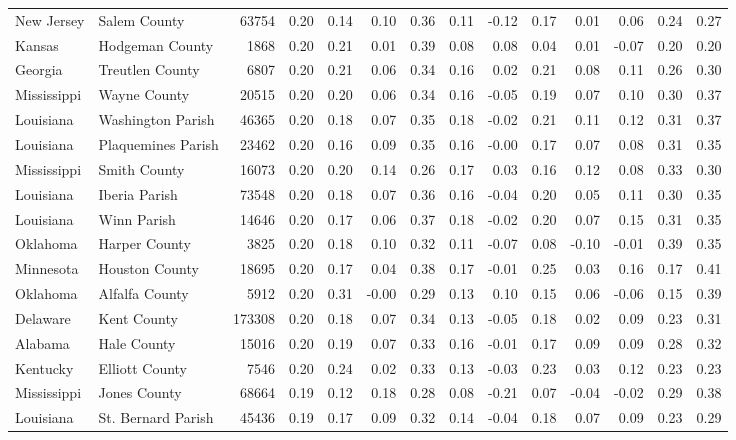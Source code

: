 \documentclass[10pt, letterpaper]{article}
\begin{document}
\begin{spacing}{1.4}
\begin{table}
{\begin{tabular}{llrrrrrrrrrrrr}
New Jersey & Salem County & 63754 & 0.20 & 0.14 & 0.10 & 0.36 & 0.11 & -0.12 & 0.17 & 0.01 & 0.06 & 0.24 & 0.27 \\
Kansas & Hodgeman County & 1868 & 0.20 & 0.21 & 0.01 & 0.39 & 0.08 & 0.08 & 0.04 & 0.01 & -0.07 & 0.20 & 0.20 \\
Georgia & Treutlen County & 6807 & 0.20 & 0.21 & 0.06 & 0.34 & 0.16 & 0.02 & 0.21 & 0.08 & 0.11 & 0.26 & 0.30 \\
Mississippi & Wayne County & 20515 & 0.20 & 0.20 & 0.06 & 0.34 & 0.16 & -0.05 & 0.19 & 0.07 & 0.10 & 0.30 & 0.37 \\
Louisiana & Washington Parish & 46365 & 0.20 & 0.18 & 0.07 & 0.35 & 0.18 & -0.02 & 0.21 & 0.11 & 0.12 & 0.31 & 0.37 \\
Louisiana & Plaquemines Parish & 23462 & 0.20 & 0.16 & 0.09 & 0.35 & 0.16 & -0.00 & 0.17 & 0.07 & 0.08 & 0.31 & 0.35 \\
Mississippi & Smith County & 16073 & 0.20 & 0.20 & 0.14 & 0.26 & 0.17 & 0.03 & 0.16 & 0.12 & 0.08 & 0.33 & 0.30 \\
Louisiana & Iberia Parish & 73548 & 0.20 & 0.18 & 0.07 & 0.36 & 0.16 & -0.04 & 0.20 & 0.05 & 0.11 & 0.30 & 0.35 \\
Louisiana & Winn Parish & 14646 & 0.20 & 0.17 & 0.06 & 0.37 & 0.18 & -0.02 & 0.20 & 0.07 & 0.15 & 0.31 & 0.35 \\
Oklahoma & Harper County & 3825 & 0.20 & 0.18 & 0.10 & 0.32 & 0.11 & -0.07 & 0.08 & -0.10 & -0.01 & 0.39 & 0.35 \\
Minnesota & Houston County & 18695 & 0.20 & 0.17 & 0.04 & 0.38 & 0.17 & -0.01 & 0.25 & 0.03 & 0.16 & 0.17 & 0.41 \\
Oklahoma & Alfalfa County & 5912 & 0.20 & 0.31 & -0.00 & 0.29 & 0.13 & 0.10 & 0.15 & 0.06 & -0.06 & 0.15 & 0.39 \\
Delaware & Kent County & 173308 & 0.20 & 0.18 & 0.07 & 0.34 & 0.13 & -0.05 & 0.18 & 0.02 & 0.09 & 0.23 & 0.31 \\
Alabama & Hale County & 15016 & 0.20 & 0.19 & 0.07 & 0.33 & 0.16 & -0.01 & 0.17 & 0.09 & 0.09 & 0.28 & 0.32 \\
Kentucky & Elliott County & 7546 & 0.20 & 0.24 & 0.02 & 0.33 & 0.13 & -0.03 & 0.23 & 0.03 & 0.12 & 0.23 & 0.23 \\
Mississippi & Jones County & 68664 & 0.19 & 0.12 & 0.18 & 0.28 & 0.08 & -0.21 & 0.07 & -0.04 & -0.02 & 0.29 & 0.38 \\
Louisiana & St. Bernard Parish & 45436 & 0.19 & 0.17 & 0.09 & 0.32 & 0.14 & -0.04 & 0.18 & 0.07 & 0.09 & 0.23 & 0.29 \\

\end{tabular}}
\end{table}
\end{spacing}
\end{document}
